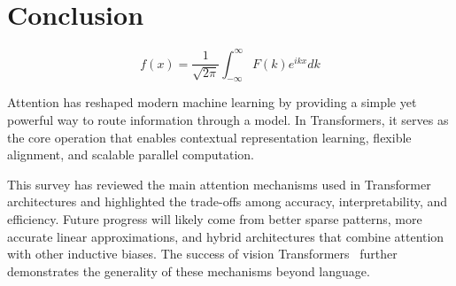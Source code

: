 \documentclass[a4paper,11pt]{article}
\begin{document}
\section{Conclusion}

\[f(x)=\frac{1}{\sqrt{2\pi}}\int_{-\infty}^{\infty}F(k)e^{ikx}dk\]

Attention has reshaped modern machine learning by providing a simple yet powerful way to route information through a model. In Transformers, it serves as the core operation that enables contextual representation learning, flexible alignment, and scalable parallel computation.

This survey has reviewed the main attention mechanisms used in Transformer architectures and highlighted the trade-offs among accuracy, interpretability, and efficiency. Future progress will likely come from better sparse patterns, more accurate linear approximations, and hybrid architectures that combine attention with other inductive biases. The success of vision Transformers~\cite{dosovitskiy2021image} further demonstrates the generality of these mechanisms beyond language.



\end{document}
